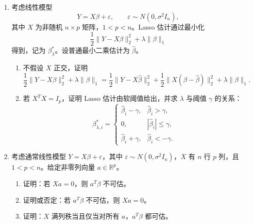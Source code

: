 \documentclass[UTF8,12pt]{ctexart}
\begin{document}
\begin{enumerate}[label=\textbf{\arabic*.},leftmargin=2.2em]
\item 考虑线性模型
\[
Y=X\beta+\varepsilon,\qquad \varepsilon\sim N(0,\sigma^2 I_n),
\]
其中 \(X\) 为非随机 \(n\times p\) 矩阵，\(1<p<n\)。Lasso 估计通过最小化
\[
\frac12\|Y-X\beta\|_2^2+\lambda\|\beta\|_1
\]
得到，记为 \(\beta_\lambda^\ast\)。设普通最小二乘估计为 \(\widehat\beta\)。
\begin{enumerate}[label=\textbf{(\alph*)},leftmargin=2.4em]
\item 不假设 \(X\) 正交，证明
\[
\frac12\|Y-X\beta\|_2^2+\lambda\|\beta\|_1
=\frac12\|Y-X\widehat\beta\|_2^2+\frac12\|X(\beta-\widehat\beta)\|_2^2+\lambda\|\beta\|_1.
\]
\item 若 \(X^TX=I_p\)，证明 Lasso 估计由软阈值给出，并求 \(\lambda\) 与阈值 \(\gamma\) 的关系：
\[
\beta_{\lambda,i}^\ast=
\begin{cases}
\widehat\beta_i-\gamma,& \widehat\beta_i>\gamma,\\
0,&|\widehat\beta_i|\le\gamma,\\
\widehat\beta_i+\gamma,&\widehat\beta_i<-\gamma.
\end{cases}
\]
\end{enumerate}

\item 考虑通常线性模型 \(Y=X\beta+\varepsilon\)，其中 \(\varepsilon\sim N(0,\sigma^2I_n)\)，\(X\) 有 \(n\) 行 \(p\) 列，且 \(1<p<n\)。给定非零列向量 \(a\in\mathbb R^p\)。
\begin{enumerate}[label=\textbf{(\alph*)},leftmargin=2.4em]
\item 证明：若 \(Xa=0\)，则 \(a^T\beta\) 不可估。
\item 证明或否定：若 \(a^T\beta\) 不可估，则 \(Xa=0\)。
\item 证明：\(X\) 满列秩当且仅当对所有 \(a\)，\(a^T\beta\) 都可估。
\end{enumerate}
\end{enumerate}
\end{document}

